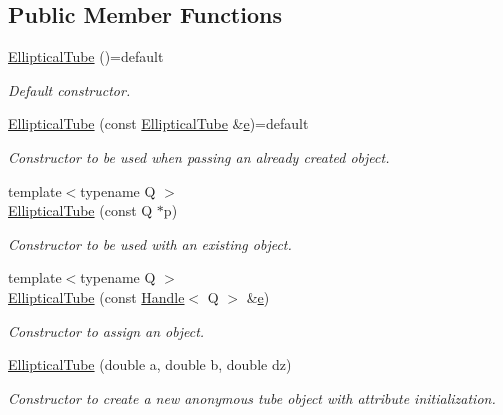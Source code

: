 \subsection*{Public Member Functions}
\begin{DoxyCompactItemize}
\item 
\hyperlink{class_d_d4hep_1_1_geometry_1_1_elliptical_tube_aed5afac54a520885363aa5e11da24a42}{Elliptical\+Tube} ()=default
\begin{DoxyCompactList}\small\item\em Default constructor. \end{DoxyCompactList}\item 
\hyperlink{class_d_d4hep_1_1_geometry_1_1_elliptical_tube_a804d28e0c14220a3040545f3d84cbf53}{Elliptical\+Tube} (const \hyperlink{class_d_d4hep_1_1_geometry_1_1_elliptical_tube}{Elliptical\+Tube} \&\hyperlink{_volumes_8cpp_a8a9a1f93e9b09afccaec215310e64142}{e})=default
\begin{DoxyCompactList}\small\item\em Constructor to be used when passing an already created object. \end{DoxyCompactList}\item 
{\footnotesize template$<$typename Q $>$ }\\\hyperlink{class_d_d4hep_1_1_geometry_1_1_elliptical_tube_a5274cff655cb06dfd4d13abd20498720}{Elliptical\+Tube} (const Q $\ast$p)
\begin{DoxyCompactList}\small\item\em Constructor to be used with an existing object. \end{DoxyCompactList}\item 
{\footnotesize template$<$typename Q $>$ }\\\hyperlink{class_d_d4hep_1_1_geometry_1_1_elliptical_tube_a704fc2e62e0889782599c036785a37d8}{Elliptical\+Tube} (const \hyperlink{class_d_d4hep_1_1_handle}{Handle}$<$ Q $>$ \&\hyperlink{_volumes_8cpp_a8a9a1f93e9b09afccaec215310e64142}{e})
\begin{DoxyCompactList}\small\item\em Constructor to assign an object. \end{DoxyCompactList}\item 
\hyperlink{class_d_d4hep_1_1_geometry_1_1_elliptical_tube_a4f6811e402eace05bb1640b8d2e50d48}{Elliptical\+Tube} (double a, double b, double dz)
\begin{DoxyCompactList}\small\item\em Constructor to create a new anonymous tube object with attribute initialization. \end{DoxyCompactList}\item 

\end{DoxyCompactItemize}
